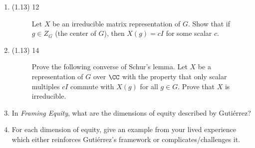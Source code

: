 \documentclass{math174}
\date{Monday, February 20}
\author{}
\begin{document}
\begin{enumerate}
\item
  \begin{description}
  \item[(1.13) 12] Let \(X\) be an irreducible matrix representation
    of \(G\).  Show that if \(g \in Z_G\) (the center of \(G\)), then
    \(X(g) = cI\) for some scalar \(c.\)

    \begin{solution}

    \end{solution}
  \end{description}
\item
  \begin{description}
  \item[(1.13) 14] Prove the following converse of Schur's lemma.  Let
    \(X\) be a representation of \(G\) over \(\CC\) with the property
    that only scalar multiples \(cI\) commute with \(X(g)\) for all
    \(g \in G\).  Prove that \(X\) is irreducible.

    \begin{solution}

    \end{solution}
  \end{description}
\item In \textit{Framing Equity}, what are the dimensions of equity
  described by Guti\'errez?

  \begin{solution}

  \end{solution}

\item For each dimension of equity, give an example from your lived
  experience which either reinforces Guti\'errez's framework or
  complicates/challenges it.

  \begin{solution}

  \end{solution}
\end{enumerate}
\end{document}
